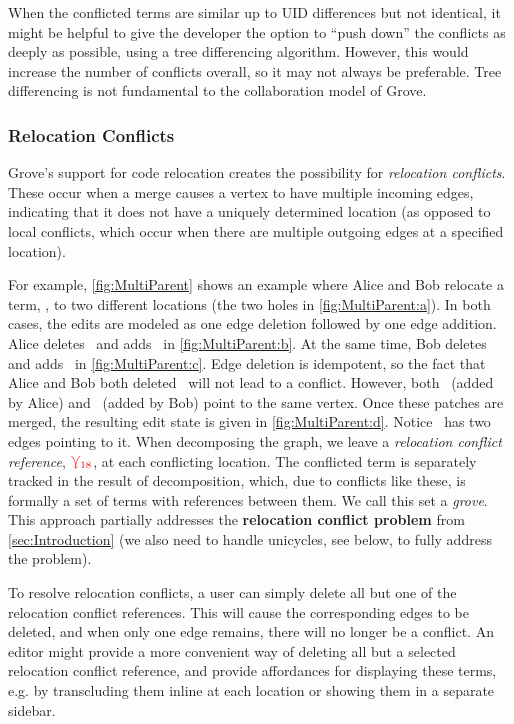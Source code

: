 When the conflicted terms are similar up to UID differences but not identical, it might be helpful  to give the developer the option to ``push down'' the conflicts as deeply as possible, using a tree differencing algorithm. However, this would increase the number of conflicts overall, so it may not always be preferable. Tree differencing is not fundamental to the collaboration model of Grove.


\subsubsection{Relocation Conflicts}%
\label{sub:Multi-parent conflicts}

\figureMultiParent

Grove's support for code relocation creates the possibility for \emph{relocation conflicts}. These occur when a merge causes a vertex to have multiple incoming edges, indicating that it does not have a uniquely determined location (as opposed to local conflicts, which occur when there are multiple outgoing edges at a specified location). 

For example, \autoref{fig:MultiParent} shows an example where Alice and Bob relocate a term, , to two different locations (the two holes in \autoref{fig:MultiParent:a}). In both cases, the edits are modeled as one edge deletion followed by one edge addition.
Alice deletes~\eNestedPartsAlice{} and adds~\eMultiParentAlice{} in \autoref{fig:MultiParent:b}.
At the same time, Bob deletes~\eNestedPartsAlice{} and adds~\eMultiParentBob{} in \autoref{fig:MultiParent:c}.
Edge deletion is idempotent,
so the fact that Alice and Bob both deleted~\eNestedPartsAlice{} will not lead to a conflict. 
However, both~\eMultiParentAlice{} (added by Alice) and~\eMultiParentBob{} (added by Bob)
point to the same vertex.
Once these patches are merged, the resulting edit state is given in \autoref{fig:MultiParent:d}.
Notice~\vNestedPartsAlice{} has two edges pointing to it. 
When decomposing the graph, we leave a \emph{relocation conflict reference}, $\textcolor{red}{\curlyveedownarrow_{18}}$, at each conflicting location. The conflicted term is separately tracked in the result of decomposition, which, due to conflicts like these, is formally a set of terms with references between them. We call this set a \emph{grove}. 
This approach partially addresses the \textbf{relocation conflict problem} from \autoref{sec:Introduction} (we also need to handle unicycles, see below, to fully address the problem).

To resolve relocation conflicts, a user can simply delete all but one of the relocation conflict references. This will cause the corresponding edges to be deleted,
and when only one edge remains, there will no longer be a conflict. An editor might provide a more convenient way of deleting all but a selected relocation conflict reference, and provide affordances for displaying these terms, e.g. by transcluding them inline at each location or showing them in a separate sidebar.

